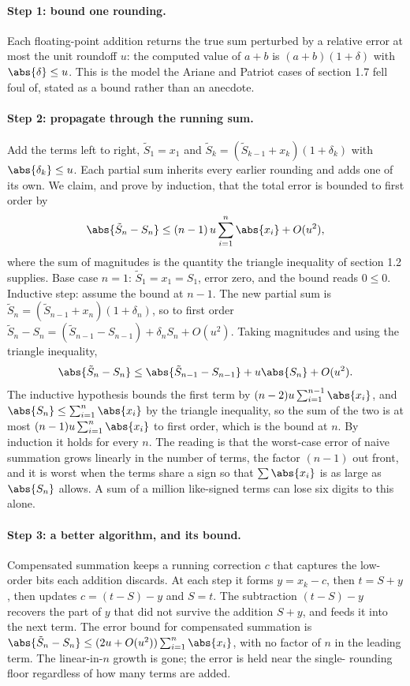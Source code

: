 \paragraph{Step 1: bound one rounding.} Each floating-point addition
returns the true sum perturbed by a relative error at most the unit
roundoff $u$: the computed value of $a + b$ is $(a + b)(1 + \delta)$ with
$\abs{\delta} \leq u$. This is the model the Ariane and Patriot cases of
section 1.7 fell foul of, stated as a bound rather than an anecdote.

\paragraph{Step 2: propagate through the running sum.} Add the terms
left to right, $\tilde S_{1} = x_{1}$ and $\tilde S_{k} = (\tilde
S_{k-1} + x_{k})(1 + \delta_{k})$ with $\abs{\delta_{k}} \leq u$. Each
partial sum inherits every earlier rounding and adds one of its own. We
claim, and prove by induction, that the total error is bounded to first
order by
\[
\abs{\tilde S_{n} - S_{n}} \leq (n - 1)\, u \sum_{i=1}^{n} \abs{x_{i}}
+ O(u^{2}),
\]
where the sum of magnitudes is the quantity the triangle inequality of
section 1.2 supplies. Base case $n = 1$: $\tilde S_{1} = x_{1} = S_{1}$,
error zero, and the bound reads $0 \leq 0$. Inductive step: assume the
bound at $n - 1$. The new partial sum is $\tilde S_{n} = (\tilde S_{n-1}
+ x_{n})(1 + \delta_{n})$, so to first order $\tilde S_{n} - S_{n} =
(\tilde S_{n-1} - S_{n-1}) + \delta_{n} S_{n} + O(u^{2})$. Taking
magnitudes and using the triangle inequality,
\[
\abs{\tilde S_{n} - S_{n}}
\leq \abs{\tilde S_{n-1} - S_{n-1}} + u \abs{S_{n}} + O(u^{2}).
\]
The inductive hypothesis bounds the first term by $(n - 2) u
\sum_{i=1}^{n-1} \abs{x_{i}}$, and $\abs{S_{n}} \leq \sum_{i=1}^{n}
\abs{x_{i}}$ by the triangle inequality, so the sum of the two is at most
$(n - 1) u \sum_{i=1}^{n} \abs{x_{i}}$ to first order, which is the bound
at $n$. By induction it holds for every $n$. The reading is that the
worst-case error of naive summation grows linearly in the number of
terms, the factor $(n - 1)$ out front, and it is worst when the terms
share a sign so that $\sum \abs{x_{i}}$ is as large as $\abs{S_{n}}$
allows. A sum of a million like-signed terms can lose six digits to this
alone.

\paragraph{Step 3: a better algorithm, and its bound.} Compensated
summation keeps a running correction $c$ that captures the low-order bits
each addition discards. At each step it forms $y = x_{k} - c$, then $t =
S + y$, then updates $c = (t - S) - y$ and $S = t$. The subtraction
$(t - S) - y$ recovers the part of $y$ that did not survive the addition
$S + y$, and feeds it into the next term. The error bound for compensated
summation is $\abs{\tilde S_{n} - S_{n}} \leq (2 u + O(u^{2}))
\sum_{i=1}^{n} \abs{x_{i}}$, with no factor of $n$ in the leading term.
The linear-in-$n$ growth is gone; the error is held near the single-
rounding floor regardless of how many terms are added.

